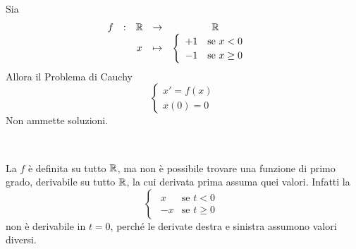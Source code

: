\begin{example}
	Sia
	\[\begin{array}{ccccc} {f} & : & {\mathbb{R}} & \to & {\mathbb{R}} \\ & & {x} & \mapsto & {	\begin{cases}
						\begin{array}{ll}
							+1 & \text{se } x < 0\\
							-1 & \text{se } x \geq 0
						\end{array}
					\end{cases}} \\ \end{array}\]
	Allora il Problema di Cauchy
	\[\begin{cases}
		x'=f(x)\\
		x(0) = 0
	\end{cases}\]
	Non ammette soluzioni. %

	\begin{solution}
		~
		\begin{center}
		\end{center}
		La $f$ è definita su tutto $\mathbb{R}$, ma non è possibile trovare una funzione di primo grado, derivabile su tutto $\mathbb{R}$, la cui derivata prima assuma quei valori. Infatti la
		\[\begin{cases}
			\begin{array}{ll}
				x & \text{se } t < 0\\
				-x & \text{se } t \geq 0
			\end{array}
		\end{cases}\]
		non è derivabile in $t = 0$, perché le derivate destra e sinistra assumono valori diversi.
	\end{solution}
\end{example}
